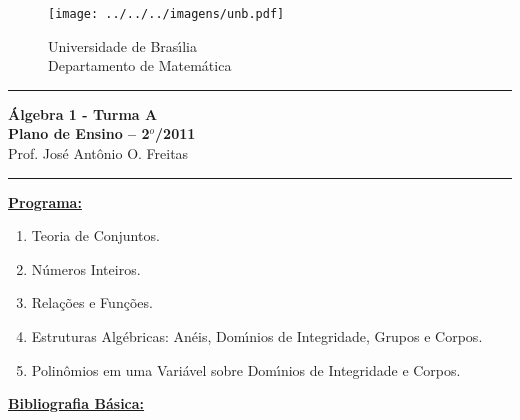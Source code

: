 \documentclass{article}
\begin{document}
\pagestyle{empty}

\begin{figure}[h]
        \begin{minipage}[c]{1.7cm}
        \texttt{[image: ../../../imagens/unb.pdf]}
        \end{minipage}%
        \hspace{0pt}
        \begin{minipage}[c]{4in}
          {Universidade de Bras{\'\i}lia} \\
          {Departamento de Matem{\'a}tica}
\end{minipage}
\end{figure}
\vspace{-0.35cm} \hrule

\begin{center}
{\Large\bf {\'A}lgebra 1 - Turma A} \\ \vspace{9pt} {\large\bf Plano
de Ensino -- 2$^{o}$/2011}\\ \vspace{9pt} Prof. Jos{\'e} Ant{\^o}nio O. Freitas
\end{center}
\hrule

\vspace{9pt}
\noindent \textbf{\underline{Programa:}}
\begin{enumerate}[label={\arabic*})]

\item Teoria de Conjuntos.

\item N{\'u}meros Inteiros.

\item Rela{\c c}{\~o}es e Fun{\c c}{\~o}es.

\item Estruturas Alg{\'e}bricas: An{\'e}is, Dom{\'\i}nios de
  Integridade, Grupos e Corpos.

\item Polin{\^o}mios em uma Vari{\'a}vel sobre Dom{\'\i}nios de Integridade e Corpos.
\end{enumerate}

\vspace{9pt}
\noindent \textbf{\underline{Bibliografia B{\'a}sica:}}
\vspace{0.15cm}
\end{document}
